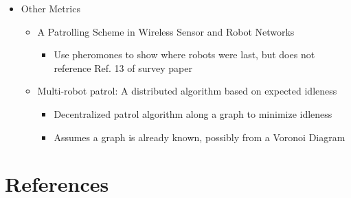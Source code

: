 \documentclass[review]{elsarticle}
\begin{document}
\begin{itemize}
\begin{itemize}
\begin{itemize}
		\end{itemize}	
	\end{itemize}
	\item Other Metrics
	\begin{itemize}
		\item A Patrolling Scheme in Wireless Sensor and Robot Networks~\cite{ZhaXia11}
		\begin{itemize}
			\item Use pheromones to show where robots were last, but does not reference Ref. 13 of survey paper
		\end{itemize}
		\item Multi-robot patrol: A distributed algorithm based on expected idleness~\cite{YanZha16}
		\begin{itemize}
			\item Decentralized patrol algorithm along a graph to minimize idleness
			\item Assumes a graph is already known, possibly from a Voronoi Diagram
		\end{itemize}
	\end{itemize}
\end{itemize}


\section*{References}

\end{document}
